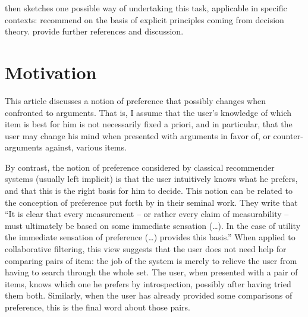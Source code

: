 \documentclass[french, english]{da2pl2018}
\begin{document}
 then sketches one possible way of undertaking this task, applicable in specific contexts: recommend on the basis of explicit principles coming from decision theory.  provide further references and discussion.

\section{Motivation}
\label{sec:disc}
This article discusses a notion of preference that possibly changes when confronted to arguments. That is, I assume that the user’s knowledge of which item is best for him is not necessarily fixed a priori, and in particular, that the user may change his mind when presented with arguments in favor of, or counter-arguments against, various items. 

By contrast, the notion of preference considered by classical recommender systems (usually left implicit) is that the user intuitively knows what he prefers, and that this is the right basis for him to decide. This notion can be related to the conception of preference put forth by \citet[p. 16]{von_neumann_theory_1944} in their seminal work. They write that “It is clear that every measurement – or rather every claim of measurability – must ultimately be based on some immediate sensation (…). In the case of utility the immediate sensation of preference (…) provides this basis.” When applied to collaborative filtering, this view suggests that the user does not need help for comparing pairs of item: the job of the system is merely to relieve the user from having to search through the whole set. 
The user, when presented with a pair of items, knows which one he prefers by introspection, possibly after having tried them both. %
Similarly, when the user has already provided some comparisons of preference, this is the final word about those pairs.
\end{document}
